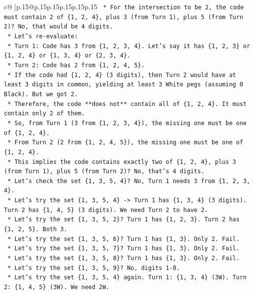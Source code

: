 \documentclass{article}
\begin{document}
{\begin{supertabular}{c@{$\;$}|p{.15\linewidth}@{}p{.15\linewidth}p{.15\linewidth}p{.15\linewidth}p{.15\linewidth}p{.15\linewidth}}
{{{\texttt{    *   For the intersection to be 2, the code must contain 2 of \{1, 2, 4\}, plus 3 (from Turn 1), plus 5 (from Turn 2)? No, that would be 4 digits.} \\
\texttt{    *   Let's re{-}evaluate:} \\
\texttt{        *   Turn 1: Code has 3 from \{1, 2, 3, 4\}. Let's say it has \{1, 2, 3\} or \{1, 2, 4\} or \{1, 3, 4\} or \{2, 3, 4\}.} \\
\texttt{        *   Turn 2: Code has 2 from \{1, 2, 4, 5\}.} \\
\texttt{        *   If the code had \{1, 2, 4\} (3 digits), then Turn 2 would have at least 3 digits in common, yielding at least 3 White pegs (assuming 0 Black). But we got 2.} \\
\texttt{        *   Therefore, the code **does not** contain all of \{1, 2, 4\}. It must contain only 2 of them.} \\
\texttt{        *   So, from Turn 1 (3 from \{1, 2, 3, 4\}), the missing one must be one of \{1, 2, 4\}.} \\
\texttt{        *   From Turn 2 (2 from \{1, 2, 4, 5\}), the missing one must be one of \{1, 2, 4\}.} \\
\texttt{        *   This implies the code contains exactly two of \{1, 2, 4\}, plus 3 (from Turn 1), plus 5 (from Turn 2)? No, that's 4 digits.} \\
\texttt{        *   Let's check the set \{1, 3, 5, 4\}? No, Turn 1 needs 3 from \{1, 2, 3, 4\}.} \\
\texttt{        *   Let's try the set \{1, 3, 5, 4\} {-}> Turn 1 has \{1, 3, 4\} (3 digits). Turn 2 has \{1, 4, 5\} (3 digits). We need Turn 2 to have 2.} \\
\texttt{        *   Let's try the set \{1, 3, 5, 2\}? Turn 1 has \{1, 2, 3\}. Turn 2 has \{1, 2, 5\}. Both 3.} \\
\texttt{        *   Let's try the set \{1, 3, 5, 6\}? Turn 1 has \{1, 3\}. Only 2. Fail.} \\
\texttt{        *   Let's try the set \{1, 3, 5, 7\}? Turn 1 has \{1, 3\}. Only 2. Fail.} \\
\texttt{        *   Let's try the set \{1, 3, 5, 8\}? Turn 1 has \{1, 3\}. Only 2. Fail.} \\
\texttt{        *   Let's try the set \{1, 3, 5, 9\}? No, digits 1{-}8.} \\
\texttt{        *   Let's try the set \{1, 3, 5, 4\} again. Turn 1: \{1, 3, 4\} (3W). Turn 2: \{1, 4, 5\} (3W). We need 2W.} \\
}}}
\end{supertabular}}
\end{document}
